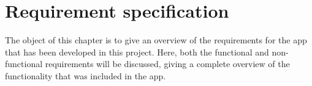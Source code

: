 \chapter{Requirement specification}
\label{sec:recSpecification}

The object of this chapter is to give an overview of the requirements for the app that has been developed in this project. Here, both the functional and non-functional requirements will be discussed, giving a complete overview of the functionality that was included in the app.



\newpage
